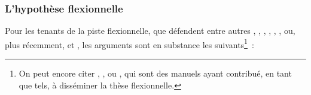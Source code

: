 \documentclass[output=paper]{langsci/langscibook}
\begin{document}
\subsubsection{L'hypothèse flexionnelle}\label{section:dal:2.2.1}

Pour les tenants de la piste flexionnelle, que défendent entre autres %
\citet[110]{Hockett58}%
%
, %
\citet{Lyons68}%
%
, 
\citet{SugiokaLehr1983}%
%
,
\citet[95]{Miller91}%
%
, %
\citet[49--50]{Haspelmath1996}%
%
, %
\citet[230--235]{Baker03}%
%
, ou, plus récemment, %
\citet{Giegerich12} %
%
et %
\citet{Pittner15}%
%
, les arguments sont en substance les suivants\footnote{On peut encore citer %
\citet{Emonds76}%
%
, %
\citet{Radford88}%
%
, %
\citet{Plag.2003g} %
%
ou %
\citet{Bassac04}%
%
, qui sont des manuels ayant contribué, en tant que tels, à disséminer la thèse flexionnelle.}~:
\end{document}
